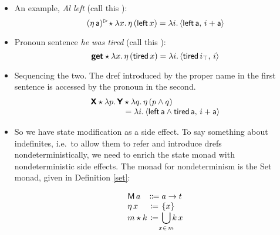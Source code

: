 \begin{itemize}
	\item An example, \emph{Al left} (call this ):
	\[(\eta\,\textsf{a})^\rhd\! \star \lambda x.\,\eta\,(\textsf{left}\,x) = \lambda i.\,\langle \textsf{left}\,\textsf{a},\,i+\textsf{a} \rangle\]%
	
	\item Pronoun sentence \emph{he was tired} (call this ):
	\[\textbf{\textsf{get}} \star \lambda x.\,\eta\,(\textsf{tired}\,x) = \lambda i.\,\langle \textsf{tired}\,i_\top,\,i \rangle\]%
	
	\item Sequencing the two. The dref introduced by the proper name in the first sentence is accessed by the pronoun in the second. %
	\[\begin{array}{r@{}l}
		\bsf{X} \star \lambda p.\,\bsf{Y}&{}\star \lambda q.\,\eta\,(p \wedge q) %
		\\
		&{}= \lambda i.\,\ab{\textsf{left}\,\textsf{a} \wedge \textsf{tired}\,\textsf{a},\,i+\textsf{a}}%
	\end{array}\]
	
	\item So we have state modification as a side effect. To say something about indefinites, i.e.~to allow them to refer and introduce drefs nondeterministically, we need to enrich the state monad with nondeterministic side effects. The monad for nondeterminism is the Set monad, given in Definition \ref{set}:%
	\begin{defi}\label{set}
		\[\begin{array}[t]
			{@{}l@{}c@{}l@{}}
			\textsf{M}\,a &{}\Coloneqq{} &a \ra t%
			\\
			\eta\,x &{}\ceq{} &\{x\}
			\\
			m \star k &{}\ceq{} &\displaystyle\bigcup_{\mathclap{x\in \,m}}k\,x%
		\end{array}\]
	\end{defi}


\end{itemize}
